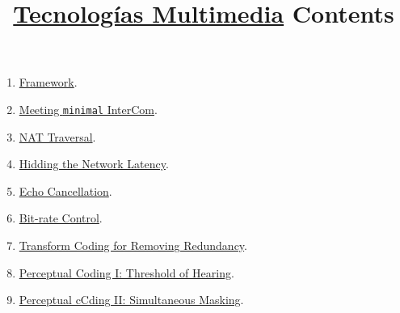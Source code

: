 
\title{\href{https://tecnologias-multimedia.github.io/}{Tecnologías Multimedia} \newline Contents}

\maketitle

\begin{enumerate}
\item \href{https://tecnologias-multimedia.github.io/contents/framework/}{Framework}.
\item \href{https://tecnologias-multimedia.github.io/contents/minimal/}{Meeting \texttt{minimal} InterCom}.
\item \href{https://tecnologias-multimedia.github.io/contents/NAT_traversal/}{NAT Traversal}.
\item \href{https://tecnologias-multimedia.github.io/contents/latency/}{Hidding the Network Latency}.
\item \href{https://tecnologias-multimedia.github.io/contents/echo_cancellation/}{Echo Cancellation}.
\item \href{https://tecnologias-multimedia.github.io/contents/BR_control/}{Bit-rate Control}.
\item \href{https://tecnologias-multimedia.github.io/contents/transform_coding/}{Transform Coding for Removing Redundancy}.
\item \href{https://tecnologias-multimedia.github.io/contents/threshold_of_hearing/}{Perceptual Coding I: Threshold of Hearing}.
\item \href{https://tecnologias-multimedia.github.io/contents/simultaneous_masking/}{Perceptual cCding II: Simultaneous Masking}.
\end{enumerate}



